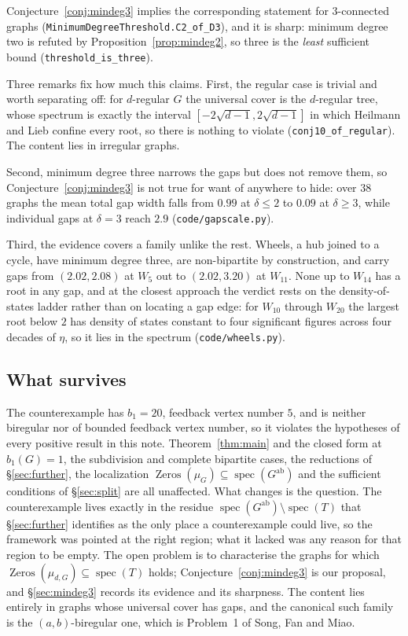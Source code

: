 \documentclass[11pt]{article}
\theoremstyle{remark}
\begin{document}
Conjecture~\ref{conj:mindeg3} implies the corresponding statement for $3$-connected graphs
(\texttt{MinimumDegreeThreshold.C2\_of\_D3}), and it is sharp: minimum degree two is refuted by
Proposition~\ref{prop:mindeg2}, so three is the \emph{least} sufficient bound
(\texttt{threshold\_is\_three}).

Three remarks fix how much this claims. First, the regular case is trivial and worth separating
off: for $d$-regular $G$ the universal cover is the $d$-regular tree, whose spectrum is exactly
the interval $[-2\sqrt{d-1},2\sqrt{d-1}]$ in which Heilmann and Lieb confine every root, so there
is nothing to violate (\texttt{conj10\_of\_regular}). The content lies in irregular graphs.

Second, minimum degree three narrows the gaps but does not remove them, so
Conjecture~\ref{conj:mindeg3} is not true for want of anywhere to hide: over $38$ graphs the mean
total gap width falls from $0.99$ at $\delta\le2$ to $0.09$ at $\delta\ge3$, while individual
gaps at $\delta=3$ reach $2.9$ (\texttt{code/gapscale.py}).

Third, the evidence covers a family unlike the rest. Wheels, a hub joined to a cycle, have
minimum degree three, are non-bipartite by construction, and carry gaps from $(2.02,2.08)$ at
$W_5$ out to $(2.02,3.20)$ at $W_{11}$. None up to $W_{14}$ has a root in any gap, and at the
closest approach the verdict rests on the density-of-states ladder rather than on locating a gap
edge: for $W_{10}$ through $W_{20}$ the largest root below $2$ has density of states constant to
four significant figures across four decades of $\eta$, so it lies in the spectrum
(\texttt{code/wheels.py}).

\subsection{What survives}

The counterexample has $b_1=20$, feedback vertex number $5$, and is neither biregular nor
of bounded feedback vertex number, so it violates the hypotheses of every positive result
in this note. Theorem~\ref{thm:main} and the closed form at $b_1(G)=1$, the subdivision and
complete bipartite cases, the reductions of \S\ref{sec:further}, the localization
$\operatorname{Zeros}(\mu_G)\subseteq\operatorname{spec}(G^{\mathrm{ab}})$ and the
sufficient conditions of \S\ref{sec:split} are all unaffected. What changes is the
question. The counterexample lives exactly in the residue
$\operatorname{spec}(G^{\mathrm{ab}})\setminus\operatorname{spec}(T)$ that
\S\ref{sec:further} identifies as the only place a counterexample could live, so the
framework was pointed at the right region; what it lacked was any reason for that region to
be empty. The open problem is to characterise the graphs for which
$\operatorname{Zeros}(\mu_{d,G})\subseteq\operatorname{spec}(T)$ holds;
Conjecture~\ref{conj:mindeg3} is our proposal, and \S\ref{sec:mindeg3} records its evidence and
its sharpness. The content lies entirely in graphs whose universal cover has gaps, and the
canonical such family is the $(a,b)$-biregular one, which is Problem~1 of Song, Fan and Miao.
\end{document}
